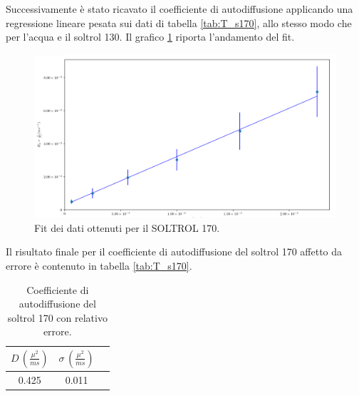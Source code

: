 Successivamente è stato ricavato il coefficiente di autodiffusione applicando una regressione lineare pesata sui dati di tabella \ref{tab:T_s170}, allo stesso modo che per l'acqua e il soltrol 130.
Il grafico \ref{fig:Df_s170} riporta l'andamento del fit.

\begin{figure}[ht]
\centering
\includegraphics[width=\columnwidth]{Figure/SOLTROL170_calc.png}
\caption{Fit dei dati ottenuti per il SOLTROL 170.}
\label{fig:Df_s170}
\end{figure}

Il risultato finale per il coefficiente di autodiffusione del soltrol 170 affetto da errore è contenuto in tabella \ref{tab:T_s170}. 


\begin{table}[ht]
    \begin{center}
    \begin{tabular}{c c c}
    \toprule
    	$D\,(\frac{{\mu}^2}{ms})$ & $\sigma\,(\frac{{\mu}^2}{ms})$ \\
    \midrule
    	0.425	&	0.011	\\
    \bottomrule
    \end{tabular}
    \caption{Coefficiente di autodiffusione del soltrol 170 con relativo errore.}
    \label{tab:Df_s170}
    \end{center}
\end{table}




